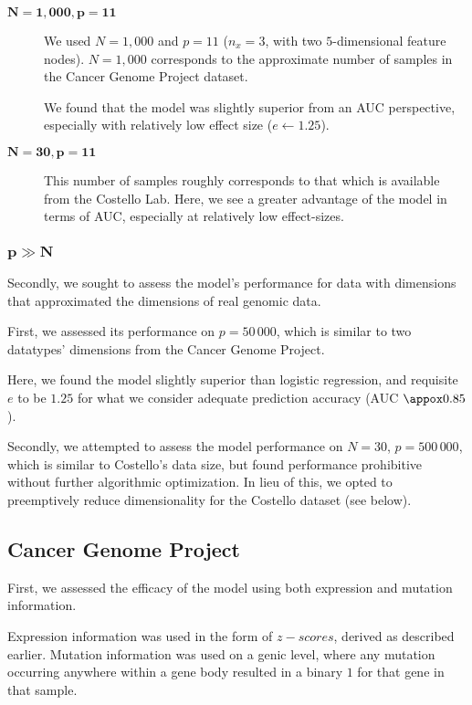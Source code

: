 \begin{description}
\item[$\mathbf{N=1,000, p=11}$] We used $N=1,000$ and $p=11$ ($n_x = 3$, with
  two $5$-dimensional feature nodes). $N=1,000$ corresponds to the
  approximate number of samples in the Cancer Genome
  Project\cite{ledford_end_2015} dataset.

  We found that the model was slightly superior from an AUC
  perspective, especially with relatively low effect size
  ($e \leftarrow 1.25$). 
  
\item[$\mathbf{N=30,p=11}$] This number of samples roughly corresponds to that
  which is available from the Costello Lab. Here, we see a greater
  advantage of the model in terms of AUC, especially at relatively low
  effect-sizes. 
\end{description}

\subsubsection{$\mathbf{p \gg N}$}

Secondly, we sought to assess the model's performance for data with dimensions that approximated the dimensions of real genomic data.

First, we assessed its performance on $p = 50\,000$, which is similar to two datatypes' dimensions from the Cancer Genome Project.

Here, we found the model slightly superior than logistic regression, and requisite $e$ to be $1.25$ for what we consider adequate prediction accuracy (AUC $\appox 0.85$). 


Secondly, we attempted to assess the model performance on  $N = 30$, $p = 500\,000$, which is similar to Costello's data size, but found performance prohibitive without further algorithmic optimization. In lieu of this, we opted to preemptively reduce dimensionality for the Costello dataset (see below).

\subsection{Cancer Genome Project}

First, we assessed the efficacy of the model using both expression and mutation information.

Expression information was used in the form of $z-scores$, derived as described earlier. Mutation information was used on a genic level, where any mutation occurring anywhere within a gene body resulted in a binary $1$ for that gene in that sample.

